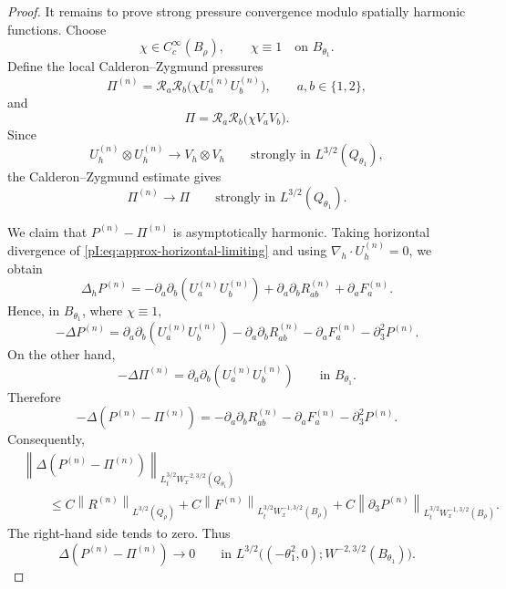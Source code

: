 \documentclass[11pt]{article}
\numberwithin{equation}{section}
\theoremstyle{plain}
\theoremstyle{definition}
\theoremstyle{remark}
\newcommand{\divh}{\nabla_h\!\cdot}
\newcommand{\norm}[2]{\left\|#1\right\|_{#2}}
\newcommand{\calR}{\mathcal R}
\begin{document}
\begin{proof}
It remains to prove strong pressure convergence modulo spatially harmonic functions.  Choose
\[
        \chi\in C_c^\infty(B_\rho),
        \qquad
        \chi\equiv1\quad\text{on }B_{\theta_1}.
\]
Define the local Calderon--Zygmund pressures
\[
        \Pi^{(n)}
        =
        \calR_a\calR_b
        \bigl(\chi U_a^{(n)}U_b^{(n)}\bigr),
        \qquad a,b\in\{1,2\},
\]
and
\[
        \Pi
        =
        \calR_a\calR_b
        \bigl(\chi V_aV_b\bigr).
\]
Since
\[
        U_h^{(n)}\otimes U_h^{(n)}
        \to
        V_h\otimes V_h
        \qquad\text{strongly in }L^{3/2}(Q_{\theta_1}),
\]
the Calderon--Zygmund estimate gives
\[
        \Pi^{(n)}\to\Pi
        \qquad\text{strongly in }L^{3/2}(Q_{\theta_1}).
\]

We claim that \(P^{(n)}-\Pi^{(n)}\) is asymptotically harmonic.  Taking horizontal divergence of \eqref{pI:eq:approx-horizontal-limiting} and using \(\divh U_h^{(n)}=0\), we obtain
\[
        \Delta_hP^{(n)}
        =
        -\partial_a\partial_b(U_a^{(n)}U_b^{(n)})
        +\partial_a\partial_bR_{ab}^{(n)}
        +\partial_aF_a^{(n)} .
\]
Hence, in \(B_{\theta_1}\), where \(\chi\equiv1\),
\[
        -\Delta P^{(n)}
        =
        \partial_a\partial_b(U_a^{(n)}U_b^{(n)})
        -\partial_a\partial_bR_{ab}^{(n)}
        -\partial_aF_a^{(n)}
        -\partial_3^2P^{(n)} .
\]
On the other hand,
\[
        -\Delta\Pi^{(n)}
        =
        \partial_a\partial_b(U_a^{(n)}U_b^{(n)})
        \qquad\text{in }B_{\theta_1}.
\]
Therefore
\[
        -\Delta(P^{(n)}-\Pi^{(n)})
        =
        -\partial_a\partial_bR_{ab}^{(n)}
        -\partial_aF_a^{(n)}
        -\partial_3^2P^{(n)} .
\]
Consequently,
\begin{align*}
&\norm{\Delta(P^{(n)}-\Pi^{(n)})}
{L^{3/2}_tW^{-2,3/2}_x(Q_{\theta_1})}
\\
&\qquad\le
C\norm{R^{(n)}}{L^{3/2}(Q_\rho)}
+
C\norm{F^{(n)}}{L^{3/2}_tW^{-1,3/2}_x(B_\rho)}
+
C\norm{\partial_3P^{(n)}}{L^{3/2}_tW^{-1,3/2}_x(B_\rho)} .
\end{align*}
The right-hand side tends to zero.  Thus
\[
        \Delta(P^{(n)}-\Pi^{(n)})\to0
        \qquad\text{in }
        L^{3/2}\bigl((-\theta_1^2,0);W^{-2,3/2}(B_{\theta_1})\bigr).
\]


\end{proof}
\end{document}
